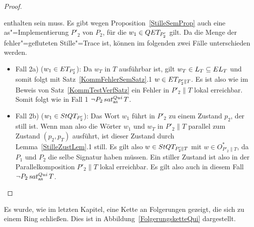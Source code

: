 \begin{proof}
\begin{itemize}
      enthalten sein muss. Es gibt wegen Proposition~\ref{StilleSemProp} auch
      eine as"=Implementierung $P'_2$ von $P_2$, für die $w_1\in QET _{P'_2}$
      gilt. Da \QET{} die Menge der fehler"=gefluteten Stille"=Trace ist,
      können im folgenden zwei Fälle unterschieden werden.
      \begin{itemize}
        \item Fall 2a) \big($w_1\in ET _{P'_2}$\big): Da $w_T$ in $T$
          ausführbar ist, gilt $w_T\in L_T\subseteq EL _T$ und somit folgt mit
          Satz~\ref{KommFehlerSemSatz}.1 $w\in ET _{P'_2\|T}$. Es ist also wie
          im Beweis von Satz~\ref{KommTestVerfSatz} ein Fehler in $P'_2\|T$
          lokal erreichbar. Somit folgt wie in Fall 1 $\neg P_2\hspace{0.05cm}sat_\mathrm{as}^{Qui}\hspace{0.05cm} T$.
        \item Fall 2b) \big($w_1\in StQT _{P'_2}$\big): Das Wort $w_1$ führt in
          $P'_2$ zu einem Zustand $p_2$, der still ist. Wenn man also die
          Wörter $w_1$ und $w_T$ in $P'_2\|T$ parallel zum Zustand $(p_2,p_T)$
          ausführt, ist dieser Zustand durch Lemma~\ref{StilleZustLem}.1 still.
          Es gilt also $w\in StQT _{P'_2\|T}$ mit $w\in O^*_{P'_2\|T}$, da
          $P_1$ und $P_2$ die selbe Signatur haben müssen. Ein stiller Zustand
          ist also in der Parallelkomposition $P'_2\|T$ lokal erreichbar. Es
          gilt also auch in diesem Fall $\neg P_2\hspace{0.05cm}sat_\mathrm{as}^{Qui}\hspace{0.05cm} T$.
      \end{itemize}
  \end{itemize}
\end{proof}

Es wurde, wie im letzten Kapitel, eine Kette an Folgerungen gezeigt, die
sich zu einem Ring schließen. Dies ist in Abbildung~\ref{FolgerungsketteQui}
dargestellt.

